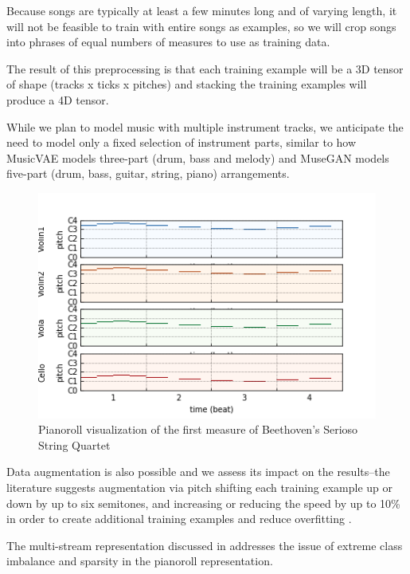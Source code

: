 \documentclass[sigconf,authorversion]{acmart}
\begin{document}
Because songs are typically at least a few minutes long and of varying
length, it will not be feasible to train with entire songs as
examples, so we will crop songs into phrases of equal numbers of
measures to use as training data.

The result of this preprocessing is that each training example will be
a 3D tensor of shape (tracks x ticks x pitches) and stacking the
training examples will produce a 4D tensor.

While we plan to model music with multiple instrument tracks, we
anticipate the need to model only a fixed selection of instrument
parts, similar to how MusicVAE models three-part (drum, bass and
melody) \cite{roberts_hierarchical_2018} and MuseGAN models five-part
(drum, bass, guitar, string, piano) arrangements.

\begin{figure}[h]
  \centering
  \includegraphics[width=\linewidth]{first_bar.png}
  \caption{Pianoroll visualization of the first measure of
    Beethoven's Serioso String Quartet}
  \label{pianoroll}
\end{figure}

Data augmentation is also possible and we assess its impact on
the results--the literature suggests augmentation via pitch shifting
each training example up or down by up to six semitones, and
increasing or reducing the speed by up to 10\% in order to create
additional training examples and reduce overfitting
\cite{oore_this_2018}.

The multi-stream representation discussed in
\cite{kumar2019polyphonic} addresses the issue of extreme class
imbalance and sparsity in the pianoroll representation.
\end{document}

